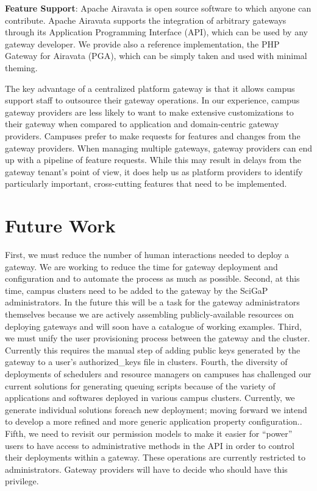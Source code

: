 \documentclass[sigconf]{acmart}
\begin{document}
\noindent\textbf{Feature Support}: Apache Airavata is open source software to which anyone can contribute. Apache Airavata supports the integration of arbitrary gateways through its Application Programming Interface (API), which can be used by any gateway developer. We provide also a reference implementation, the PHP Gateway for Airavata (PGA), which can be simply taken and used with minimal theming. 

The key advantage of a centralized platform gateway is that it allows campus support staff to outsource their gateway operations. In our experience, campus gateway providers are less likely to want to make extensive customizations to their gateway when compared to application and domain-centric gateway providers. Campuses prefer to make requests for features and changes from the gateway providers.  When managing multiple gateways, gateway providers can end up with a pipeline of feature requests.  While this may result in delays from the gateway tenant's point of view, it does help us as platform providers to identify particularly important, cross-cutting features that need to be implemented. 

\section{Future Work}
First, we must reduce the number of human interactions needed to deploy a gateway. We are working to reduce the time for gateway deployment and configuration and to automate the process as much as possible. Second, at this time, campus clusters need to be added to the gateway by the SciGaP administrators.  In the future this will be a task for the gateway administrators themselves because we are actively assembling publicly-available resources  on deploying gateways and will soon have a catalogue of  working examples.  Third, we must unify the user provisioning process between the gateway and the cluster.  Currently this requires the manual step of adding public keys generated by the gateway to a user's authorized\_keys file in clusters. Fourth, the diversity of deployments of schedulers and resource managers on campuses has challenged our current solutions for generating queuing scripts because of the variety of applications and softwares deployed in various campus clusters. Currently, we generate individual solutions foreach new deployment; moving forward we intend to develop a more refined and more generic application property configuration.. Fifth, we need to revisit our permission models to make it easier for ``power'' users to have access to administrative methods in the API in order to control their deployments within a gateway. These operations are currently restricted to administrators. Gateway providers will have to decide who should have this privilege. 
\end{document}
